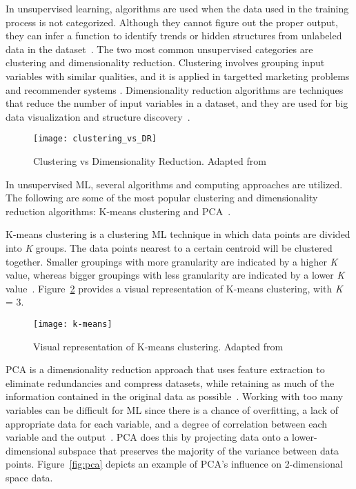 In unsupervised learning, algorithms are used when the data used in the training process is not categorized. Although they cannot figure out the proper output, they can infer a function to identify trends or hidden structures from unlabeled data in the dataset~\cite{Karazi2019StatisticalProcess-Review}. The two most common unsupervised categories are clustering and dimensionality reduction. Clustering involves grouping input variables with similar qualities, and it is applied in targetted marketing problems and recommender systems \cite{Omran2007AnMethods}. Dimensionality reduction algorithms are techniques that reduce the number of input variables in a dataset, and they are used for big data visualization and structure discovery~\cite{VanDerMaaten2009DimensionalityComparative}. 
    
    \begin{figure}[htbp]
        \centering
        \texttt{[image: clustering\_vs\_DR]}
        \caption{Clustering vs Dimensionality Reduction. Adapted from~\cite{Beck2020AModelling}}
        \label{fig:clustering_vs_DR}
    \end{figure}

In unsupervised \gls{ML}, several algorithms and computing approaches are utilized. The following are some of the most popular clustering and dimensionality reduction algorithms: K-means clustering and \gls{PCA}~\cite{Chugh2018TypesKnow}.

K-means clustering is a clustering \gls{ML} technique in which data points are divided into \textit{K} groups. The data points nearest to a certain centroid will be clustered together. Smaller groupings with more granularity are indicated by a higher \textit{K} value, whereas bigger groupings with less granularity are indicated by a lower \textit{K} value~\cite{2020WhatIBMb}. Figure~\ref{fig:k_means} provides a visual representation of K-means clustering, with \textit{K} = 3. 
    
\begin{figure}[htbp]
    \centering
    \texttt{[image: k-means]}
    \caption{Visual representation of K-means clustering. Adapted from~\cite{Beaumont2020ImageMedium}}
    \label{fig:k_means}
\end{figure}

\gls{PCA} is a dimensionality reduction approach that uses feature extraction to eliminate redundancies and compress datasets, while retaining as much of the information contained in the original data as possible~\cite{2020WhatIBMb}. Working with too many variables can be difficult for \gls{ML} since there is a chance of overfitting, a lack of appropriate data for each variable, and a degree of correlation between each variable and the output~\cite{Chugh2018TypesKnow}. \gls{PCA} does this by projecting data onto a lower-dimensional subspace that preserves the majority of the variance between data points. Figure~\ref{fig:pca} depicts an example of \gls{PCA}'s influence on 2-dimensional space data.

